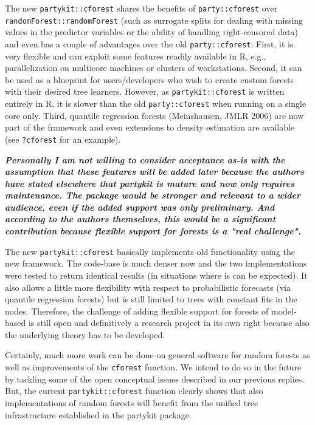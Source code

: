 \documentclass{article}
\begin{document}
\smallskip

The new \texttt{partykit::cforest} shares the benefits of
\texttt{party::cforest} over \texttt{randomForest::randomForest} (such as surrogate
splits for dealing with missing values in the predictor variables or the
ability of handling right-censored data) and even has a couple of
advantages over the old \texttt{party::cforest}: First, it is very flexible
and can exploit some features readily available in R, e.g., parallelization
on multicore machines or clusters of workstations.  Second, it can be used
as a blueprint for users/developers who wish to create custom forests with
their desired tree learners.  However, as \texttt{partykit::cforest} is
written entirely in R, it is slower than the old \texttt{party::cforest}
when running on a single core only. Third, quantile regression forests
(Meinshausen, JMLR 2006) are now part of the framework and even extensions
to density estimation are available (see \texttt{?cforest} for an example).

\textbf{\textit{%
Personally I am not willing to consider acceptance as-is with the assumption
that these features will be added later because the authors have stated
elsewhere that partykit is mature and now only requires maintenance.
The package would be stronger and relevant to a wider audience, even if the
added support was only preliminary.  And according to the authors
themselves, this would be a significant contribution because flexible
support for forests is a "real challenge".
}}

\smallskip

The new \texttt{partykit::cforest} basically implements old functionality
using the new framework. The code-base is much denser now and the two
implementations were tested to return identical results (in situations where
is can be expected). It also allows a little more flexibility with respect
to probabilistic forecasts (via quantile regression forests) but is still
limited to trees with constant fits in the nodes. Therefore, the challenge
of adding flexible support for forests of model-based is still open and
definitively a research project in its own right because also the underlying
theory has to be developed.

Certainly, much more work can be done on general software for random forests
as well as improvements of the \texttt{cforest} function.  We intend to do
so in the future by tackling some of the open conceptual issues described in
our previous replies.  But, the current \texttt{partykit::cforest} function
clearly shows that also implementations of random forests will benefit from
the unified tree infrastructure established in the partykit package.
\end{document}
